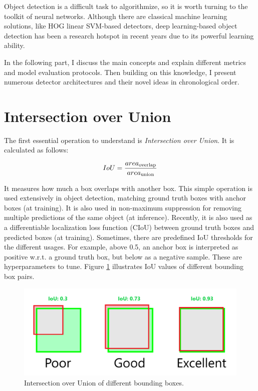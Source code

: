 Object detection is a difficult task to algorithmize, so it is worth turning to the toolkit of neural networks. Although there are classical machine learning solutions, like HOG linear SVM-based detectors\cite{VehicleDetectionHOG-SVM}, deep learning-based object detection has been a research hotspot in recent years due to its powerful learning ability\cite{ObjDetDeepLearningReview}.

In the following part, I discuss the main concepts and explain different metrics and model evaluation protocols. Then building on this knowledge, I present numerous detector architectures and their novel ideas in chronological order.

\section{Intersection over Union}

The first essential operation to understand is \textit{Intersection over Union}. It is calculated as follows: 

\[IoU=\frac{area\textsubscript{overlap}}{area\textsubscript{union}}\]

It measures how much a box overlaps with another box. This simple operation is used extensively in object detection, matching ground truth boxes with anchor boxes (at training). It is also used in non-maximum suppression\cite{NMS} for removing multiple predictions of the same object (at inference). Recently, it is also used as a differentiable localization loss function (CIoU\cite{IoULosses}) between ground truth boxes and predicted boxes (at training). Sometimes, there are predefined IoU thresholds for the different usages. For example, above 0.5, an anchor box is interpreted as positive w.r.t. a ground truth box, but below as a negative sample. These are hyperparameters to tune. Figure \ref{fig:IoU} illustrates IoU values of different bounding box pairs.

\begin{figure}[htb]
 \centerline{\includegraphics[width=1.0\columnwidth]{.//Figure/Detector/IoU.png}}
 \caption{Intersection over Union of different bounding boxes.}
 \label{fig:IoU}
\end{figure}

